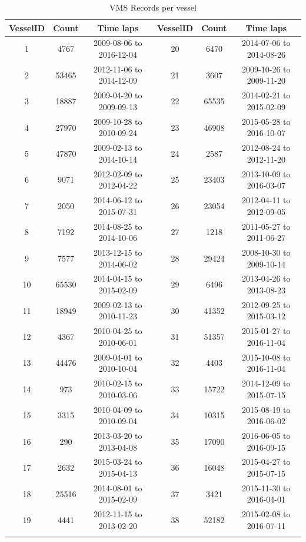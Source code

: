 \begin {table} [H]
\caption {VMS Records per vessel}
\small
\begin{center}
\begin{tabular}{c|c|c|c|c|c}
VesselID & Count & Time laps & VesselID & Count & Time laps \\
\hline

1&4767& 2009-08-06 to 2016-12-04&	20&6470&2014-07-06 to 2014-08-26\\
2&53465&2012-11-06 to 2014-12-09&	21&3607&2009-10-26 to 2009-11-20	\\
3&18887&2009-04-20 to 2009-09-13&	22&65535&2014-02-21 to 2015-02-09	\\
4&27970&2009-10-28 to 2010-09-24&	23&46908&2015-05-28 to 2016-10-07	\\
5&47870&2009-02-13 to 2014-10-14&	24&2587&2012-08-24 to 2012-11-20	\\
6&9071&2012-02-09 to 2012-04-22&		25&23403&2013-10-09 to 2016-03-07	\\
7&2050&2014-06-12 to 2015-07-31&		26&23054&2012-04-11 to 2012-09-05	\\
8&7192&2014-08-25 to 2014-10-06&		27&1218&2011-05-27 to 2011-06-27	\\
9&7577&2013-12-15 to 2014-06-02&		28&29424&2008-10-30 to 2009-10-14	\\
10&65530&2014-04-15 to 2015-02-09&	29&6496&2013-04-26 to 2013-08-23	\\
11&18949&2009-02-13 to 2010-11-23&	30&41352&2012-09-25 to 2015-03-12	\\
12&4367&2010-04-25 to 2010-06-01	&	31&51357&2015-01-27 to 2016-11-04	\\
13&44476&2009-04-01 to 2010-10-04&	32&4403&2015-10-08 to 2016-11-04	\\
14&973&2010-02-15 to 2010-03-06&		33&15722&2014-12-09 to 2015-07-15	\\
15&3315&2010-04-09 to 2010-09-04&	34&10315&2015-08-19 to 2016-06-02	\\
16&290&2013-03-20 to 2013-04-08&		35&17090&2016-06-05 to 2016-09-15	\\
17&2632&2015-03-24 to 2015-04-13&	36&16048&2015-04-27 to 2015-07-15	\\
18&25516&2014-08-01 to 2015-02-09&	37&3421&	2015-11-30 to 2016-04-01\\
19&4441&2012-11-15 to 2013-02-20&	38&52182&2015-02-08 to 2016-07-11	\\
\label{table:vms_vessels_records}
\end{tabular}
\end{center}
\end {table}


